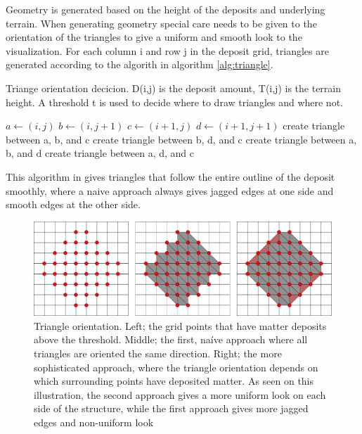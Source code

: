 \documentclass[a4paper,12pt]{report}
\newcommand{\And}{\textbf{ and }}
\begin{document}
Geometry is generated based on the height of the deposits and underlying terrain. When generating geometry special care needs to be given to the orientation of the triangles to give a uniform and smooth look to the visualization. For each column i and row j in the deposit grid, triangles are generated according to the algorith in algorithm \ref{alg:triangle}. 

\begin{algorithm}

 \caption{Triange orientation decicion. D(i,j) is the deposit amount, T(i,j) is the terrain height. A threshold t is used to decide where to draw triangles and where not.}
 \label{alg:triangle}
 \begin{algorithmic}
 
  \State $a \gets (i,j)$
  \State $b \gets (i,j+1)$
  \State $c \gets (i+1,j)$
  \State $d \gets (i+1, j+1)$
  \If {$D(c) > t \And D(b) > t$}
	\State create triangle between a, b, and c
     \EndIf
	\State create triangle between b, d, and c
     \EndIf
  \ElsIf {$D(a) > t \And D(d) > t$}
	\State create triangle between a, b, and d
     \EndIf
	\State create triangle between a, d, and c
     \EndIf
  \EndIf
  \EndFor
  
  \EndFor
  
 \end{algorithmic}

\end{algorithm}


  
This algorithm in gives triangles that follow the entire outline of the deposit smoothly, where a naive approach always gives jagged edges at one side and smooth edges at the other side.

\begin{figure}
 \includegraphics[width=\linewidth]{thesis/gridtrianglesall.pdf}
 \caption{Triangle orientation. Left; the grid points that have matter deposits above the threshold. Middle; the first, naíve approach where all triangles are oriented the same direction. Right; the more sophisticated approach, where the triangle orientation depends on which surrounding points have deposited matter. As seen on this illustration, the second approach gives a more uniform look on each side of the structure, while the first approach gives more jagged edges and non-uniform look}
\end{figure}
\end{document}
